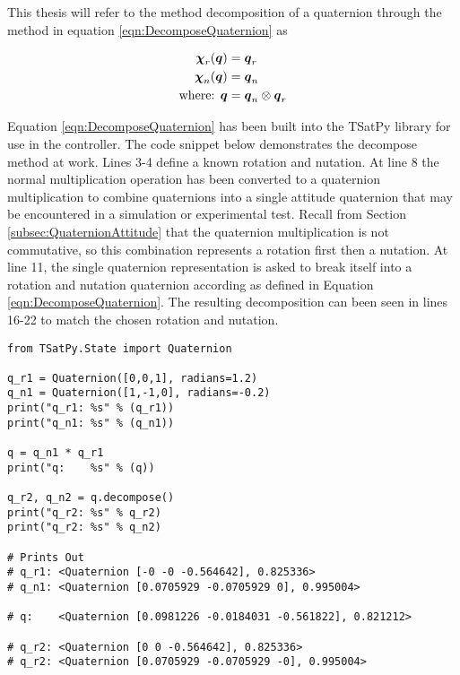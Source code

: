 This thesis will refer to the method decomposition of a quaternion through the method in equation \ref{eqn:DecomposeQuaternion} as

\begin{subequations}
  \begin{align}
  \boldsymbol{\chi}_r(\boldsymbol{q}) &= \boldsymbol{q}_r \\
  \boldsymbol{\chi}_n(\boldsymbol{q}) &= \boldsymbol{q}_n \\
  \text{where: } \boldsymbol{q} &= \boldsymbol{q}_n \otimes \boldsymbol{q}_r
  \end{align}
\end{subequations}

Equation \ref{eqn:DecomposeQuaternion} has been built into the TSatPy library for use in the controller.  The code snippet below demonstrates the decompose method at work.  Lines 3-4 define a known rotation and nutation.  At line 8 the normal multiplication operation has been converted to a quaternion multiplication to combine quaternions into a single attitude quaternion that may be encountered in a simulation or experimental test.  Recall from Section \ref{subsec:QuaternionAttitude} that the quaternion multiplication is not commutative, so this combination represents a rotation first then a nutation.  At line 11, the single quaternion representation is asked to break itself into a rotation and nutation quaternion according as defined in Equation \ref{eqn:DecomposeQuaternion}.  The resulting decomposition can been seen in lines 16-22 to match the chosen rotation and nutation.

\begin{singlespace}
  \begin{verbatim}
from TSatPy.State import Quaternion

q_r1 = Quaternion([0,0,1], radians=1.2)
q_n1 = Quaternion([1,-1,0], radians=-0.2)
print("q_r1: %s" % (q_r1))
print("q_n1: %s" % (q_n1))

q = q_n1 * q_r1
print("q:    %s" % (q))

q_r2, q_n2 = q.decompose()
print("q_r2: %s" % q_r2)
print("q_r2: %s" % q_n2)

# Prints Out
# q_r1: <Quaternion [-0 -0 -0.564642], 0.825336>
# q_n1: <Quaternion [0.0705929 -0.0705929 0], 0.995004>

# q:    <Quaternion [0.0981226 -0.0184031 -0.561822], 0.821212>

# q_r2: <Quaternion [0 0 -0.564642], 0.825336>
# q_r2: <Quaternion [0.0705929 -0.0705929 -0], 0.995004>
  \end{verbatim}
\nocite{minted}
\end{singlespace}

